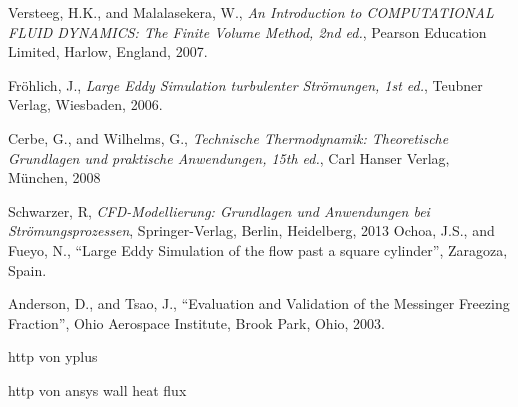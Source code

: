 Versteeg, H.K., and Malalasekera, W., \emph{An Introduction to COMPUTATIONAL FLUID DYNAMICS: The Finite Volume Method, 2nd ed.}, Pearson Education Limited, Harlow, England, 2007.

Fröhlich, J., \emph{Large Eddy Simulation turbulenter Strömungen, 1st ed.}, Teubner Verlag, Wiesbaden, 2006.

Cerbe, G., and Wilhelms, G., \emph{Technische Thermodynamik: Theoretische Grundlagen und praktische Anwendungen, 15th ed.}, Carl Hanser Verlag, München, 2008

Schwarzer, R, \emph{CFD-Modellierung: Grundlagen und Anwendungen bei Strömungsprozessen}, Springer-Verlag, Berlin, Heidelberg, 2013
Ochoa, J.S., and Fueyo, N., “Large Eddy Simulation of the flow past a square cylinder”, Zaragoza, Spain.

Anderson, D., and Tsao, J., “Evaluation and Validation of the Messinger Freezing Fraction”, Ohio Aerospace Institute, Brook Park, Ohio, 2003.

http von yplus

http von ansys wall heat flux
